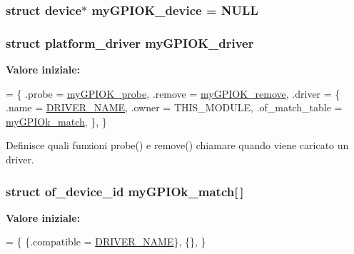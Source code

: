 \hypertarget{group___kernel-_module_ga2d345c792760e3103059b6b6e0bfdaee}{
\subsubsection[{my\+G\+P\+I\+O\+K\+\_\+device}]{\setlength{\rightskip}{0pt plus 5cm}struct device$\ast$ my\+G\+P\+I\+O\+K\+\_\+device = N\+U\+L\+L\hspace{0.3cm}{\ttfamily [static]}}}\label{group___kernel-_module_ga2d345c792760e3103059b6b6e0bfdaee}
\hypertarget{group___kernel-_module_ga8dba1541b58fa63f8208232ffce4fc47}{
\subsubsection[{my\+G\+P\+I\+O\+K\+\_\+driver}]{\setlength{\rightskip}{0pt plus 5cm}struct platform\+\_\+driver my\+G\+P\+I\+O\+K\+\_\+driver\hspace{0.3cm}{\ttfamily [static]}}}\label{group___kernel-_module_ga8dba1541b58fa63f8208232ffce4fc47}
{\bfseries Valore iniziale\+:}
\begin{DoxyCode}
= \{
        .probe = \hyperlink{group___kernel-_module_gae40973a06d72f7c41a9af07513a62307}{myGPIOK\_probe},
        .remove = \hyperlink{group___kernel-_module_ga59fddfaa36dea357f4bbdfceb0f47f8c}{myGPIOK\_remove},
        .driver = \{
                .name = \hyperlink{group___kernel-_module_ga25634d21648ca7fb7a2aca614bafaaeb}{DRIVER\_NAME},
                .owner = THIS\_MODULE,
                .of\_match\_table = \hyperlink{group___kernel-_module_ga91f28437e0a553effa546d16fa44f03a}{myGPIOk\_match},
        \},
\}
\end{DoxyCode}


Definisce quali funzioni probe() e remove() chiamare quando viene caricato un driver. 

\hypertarget{group___kernel-_module_ga91f28437e0a553effa546d16fa44f03a}{
\subsubsection[{my\+G\+P\+I\+Ok\+\_\+match}]{\setlength{\rightskip}{0pt plus 5cm}struct of\+\_\+device\+\_\+id my\+G\+P\+I\+Ok\+\_\+match\mbox{[}$\,$\mbox{]}\hspace{0.3cm}{\ttfamily [static]}}}\label{group___kernel-_module_ga91f28437e0a553effa546d16fa44f03a}
{\bfseries Valore iniziale\+:}
\begin{DoxyCode}
= \{
        \{.compatible = \hyperlink{group___kernel-_module_ga25634d21648ca7fb7a2aca614bafaaeb}{DRIVER\_NAME}\},
        \{\},
\}
\end{DoxyCode}


